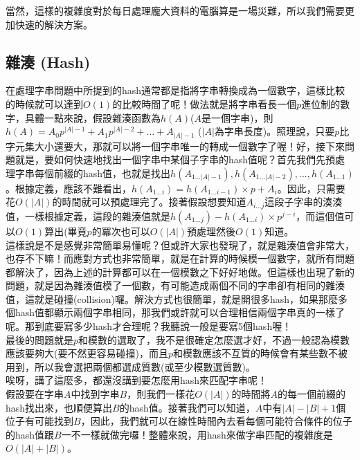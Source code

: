 \documentclass[main.tex]{subfiles}
\begin{document}
當然，這樣的複雜度對於每日處理龐大資料的電腦算是一場災難，所以我們需要更加快速的解決方案。

\subsection{雜湊 (Hash)}
在處理字串問題中所提到的hash通常都是指將字串轉換成為一個數字，這樣比較的時候就可以達到$O(1)$的比較時間了呢！做法就是將字串看長一個$p$進位制的數字，具體一點來說，假設雜湊函數為$h(A)$($A$是一個字串)，則
\begin{math}
h(A) = A_0p^{|A|-1} + A_1p^{|A|-2} + ... + A_{|A|-1}
\end{math}
($|A|$為字串長度)。照理說，只要$p$比字元集大小還要大，那就可以將一個字串唯一的轉成一個數字了喔！好，接下來問題就是，要如何快速地找出一個字串中某個子字串的hash值呢？首先我們先預處理字串每個前綴的hash值，也就是找出$h(A_{1...|A|-1}), h(A_{1...|A|-2}),...,h(A_{1...1})$。根據定義，應該不難看出，$h(A_{1...i}) = h(A_{1...i-1})\times p + A_i$。因此，只需要花$O(|A|)$的時間就可以預處理完了。接著假設想要知道$A_{i...j}$這段子字串的湊湊值，一樣根據定義，這段的雜湊值就是$h(A_{1...j}) - h(A_{1...i})\times p^{j-i}$，而這個值可以$O(1)$算出(畢竟$p$的冪次也可以$O(|A|)$預處理然後$O(1)$知道。\\

這樣說是不是感覺非常簡單易懂呢？但或許大家也發現了，就是雜湊值會非常大，也存不下嘛！而應對方式也非常簡單，就是在計算的時候模一個數字，就所有問題都解決了，因為上述的計算都可以在一個模數之下好好地做。但這樣也出現了新的問題，就是因為雜湊值模了一個數，有可能造成兩個不同的字串卻有相同的雜湊值，這就是碰撞(collision)囉。解決方式也很簡單，就是開很多hash，如果那麼多個hash值都顯示兩個字串相同，那我們或許就可以合理相信兩個字串真的一樣了呢。那到底要寫多少hash才合理呢？我聽說一般是要寫5個hash喔！\\

最後的問題就是$p$和模數的選取了，我不是很確定怎麼選才好，不過一般認為模數應該要夠大(要不然更容易碰撞)，而且$p$和模數應該不互質的時候會有某些數不被用到，所以我會選把兩個都選成質數(或至少模數選質數)。\\

唉呀，講了這麼多，都還沒講到要怎麼用hash來匹配字串呢！\\

假設要在字串$A$中找到字串$B$，則我們一樣花$O(|A|)$的時間將$A$的每一個前綴的hash找出來，也順便算出$B$的hash值。接著我們可以知道，$A$中有$|A| - |B| + 1$個位子有可能找到$B$，因此，我們就可以在線性時間內去看每個可能符合條件的位子的hash值跟$B$一不一樣就做完囉！整體來說，用hash來做字串匹配的複雜度是$O(|A| + |B|)$。\\
\end{document}
